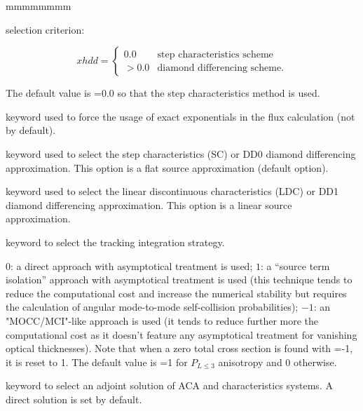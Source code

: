 \begin{ListeDeDescription}{mmmmmmmm}
\item[\dusa{xhdd}] selection criterion:

$$
xhdd = \left\{
\begin{array}{rl}
 0.0 & \textrm{step characteristics scheme} \\
>0.0 & \textrm{diamond differencing scheme.}
\end{array} \right.
$$

The default value is =0.0 so that the step characteristics method is used.

\item[\moc{LEXF}] keyword used to force the usage of exact exponentials in the flux calculation (not by default).

\item[\moc{SC}] keyword used to select the step characteristics (SC) or DD0 diamond differencing approximation. This
option is a flat source approximation (default option).

\item[\moc{LDC}] keyword used to select the linear discontinuous characteristics (LDC) or DD1 diamond differencing approximation. This
option is a linear source approximation.

\item[\moc{STIS}] keyword to select the tracking integration strategy.

\item[\dusa{istis}] $0$: a direct approach with asymptotical treatment is used; $1$: a ``source term isolation'' approach with asymptotical treatment is used (this technique tends to reduce the computational cost and increase the numerical stability but requires the calculation of angular mode-to-mode self-collision probabilities); $-1$:  an "MOCC/MCI"-like approach is used (it tends to reduce further more the computational cost as it doesn't feature any asymptotical treatment for vanishing optical thicknesses). Note that when a zero total cross section is found with =-1, it is reset to 1. The default value is =1 for $P_{L \le 3}$ anisotropy and 0 otherwise.

\item[\moc{ADJ}] keyword to select an adjoint solution of ACA and characteristics systems. A direct solution is
set by default.

\end{ListeDeDescription}
\eject
